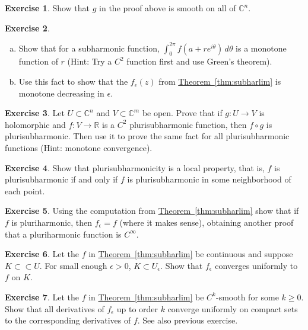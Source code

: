 \documentclass[12pt,openany]{book}
\newcommand{\C}{{\mathbb{C}}}
\newcommand{\R}{{\mathbb{R}}}
\theoremstyle{plain}
\theoremstyle{remark}
\theoremstyle{definition}
\newenvironment{exbox}{%
    \def\FrameCommand{\vrule width 1pt \relax\hspace{10pt}}%
    \MakeFramed{\advance\hsize-\width\FrameRestore}%
}{%
    \endMakeFramed
}
\newenvironment{exparts}{%
    \leavevmode\begin{enumerate}[a),noitemsep,topsep=0pt,parsep=0pt,partopsep=0pt]
}{%
    \end{enumerate}
}
\theoremstyle{exercise}
\newtheorem{exercise}{Exercise}[section]
\theoremstyle{example}
\newcommand{\thmref}[1]{\hyperref[#1]{Theorem~\ref*{#1}}}
\begin{document}
\begin{exbox}
\begin{exercise}
Show that $g$ in the proof above is smooth on all of $\C^n$.
\end{exercise}

\begin{exercise}
\begin{exparts}
\item
Show that for a subharmonic function, $\int_0^{2\pi} f(a+re^{i\theta}) \,
d\theta$ is a monotone function of $r$ (Hint: Try a $C^2$ function first and
use Green's theorem).
\item
Use this
fact to show that the $f_\epsilon(z)$ from \thmref{thm:subharlim} is monotone
decreasing in $\epsilon$.
\end{exparts}
\end{exercise}

\begin{exercise}
Let $U \subset \C^n$
and $V \subset \C^m$ be open.
Prove that
if $g \colon U \to V$ is holomorphic and $f
\colon V \to \R$ is a $C^2$ plurisubharmonic function, then 
$f \circ g$ is plurisubharmonic.
Then use it to prove the same fact
for all plurisubharmonic functions (Hint: monotone convergence).
\end{exercise}

\begin{exercise}
Show that plurisubharmonicity is a local property, that is,
$f$ is plurisubharmonic if and only if $f$ is plurisubharmonic in
some neighborhood of each point.
\end{exercise}

\begin{exercise}
Using the computation from
\thmref{thm:subharlim} show that if $f$ is pluriharmonic, then
$f_\epsilon = f$ (where it makes sense), obtaining another proof that 
a pluriharmonic function is $C^\infty$.
\end{exercise}

\begin{exercise}
Let the $f$ in \thmref{thm:subharlim} be continuous and suppose $K \subset
\subset U$.  For small enough $\epsilon >0$, $K \subset U_\epsilon$.
Show that $f_\epsilon$ converges uniformly to $f$ on $K$.
\end{exercise}

\begin{exercise}
Let the $f$ in \thmref{thm:subharlim} be $C^k$-smooth for some $k \geq 0$.
Show that all derivatives of $f_\epsilon$ up to order $k$ converge uniformly
on compact sets to the corresponding derivatives of $f$.  See also previous
exercise.
\end{exercise}
\end{exbox}
\end{document}
